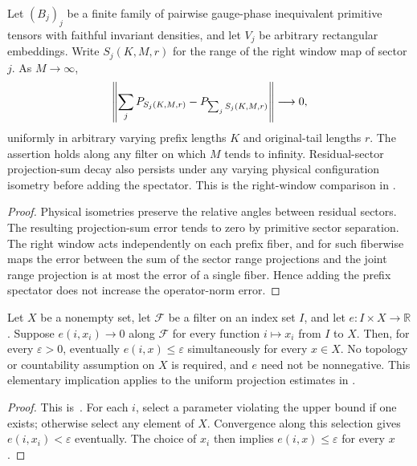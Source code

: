 \begin{lemma}
    \label{thm:residual_window_right_sector_sum}
    \leanok
    Let $(B_j)_j$ be a finite family of pairwise gauge-phase inequivalent
    primitive tensors with faithful invariant densities, and let $V_j$ be
    arbitrary rectangular embeddings. Write $S_j(K,M,r)$ for the range of the
    right window map of sector $j$. As $M\to\infty$,
    \begin{align}
        \left\|\sum_jP_{S_j(K,M,r)}-P_{\sum_jS_j(K,M,r)}\right\|\longrightarrow0,
        \notag
    \end{align}
    uniformly in arbitrary varying prefix lengths $K$ and original-tail
    lengths $r$. The assertion holds along any filter on which $M$ tends to
    infinity. Residual-sector projection-sum decay also persists under any
    varying physical configuration isometry before adding the spectator.
    This is the right-window comparison in
    \cite[Lemma~6.1(i)]{Nachtergaele1996Spectral}.
\end{lemma}
\begin{proof}\leanok
    Physical isometries preserve the relative angles between residual sectors.
    The resulting projection-sum error tends to zero by primitive sector
    separation. The right window acts independently on each prefix fiber,
    and for such fiberwise maps the error between the sum of the sector
    range projections and the joint range projection is at most the error
    of a single fiber. Hence adding the prefix spectator does not increase
    the operator-norm error.
\end{proof}

\begin{lemma}
    \label{thm:uniform_upper_bound_all_selections}
    \leanok
    Let $X$ be a nonempty set, let $\mathcal F$ be a filter on an index set
    $I$, and let $e:I\times X\to\mathbb R$.
    Suppose $e(i,x_i)\to0$ along $\mathcal F$ for every function
    $i\mapsto x_i$ from $I$ to $X$. Then, for every $\varepsilon>0$,
    eventually $e(i,x)\leq\varepsilon$ simultaneously for every $x\in X$.
    No topology or countability assumption on $X$ is required, and $e$
    need not be nonnegative. This elementary implication applies to the
    uniform projection estimates in
    \cite[Lemma~commutation(ii)]{Nachtergaele1996Spectral}.
\end{lemma}
\begin{proof}\leanok
    This is~\cite[``Uniform upper bounds from all
        selections'']{QICLean2026Blueprint}.
    For each $i$, select a parameter violating the upper bound if one exists;
    otherwise select any element of $X$.
    Convergence along this selection gives $e(i,x_i)<\varepsilon$ eventually.
    The choice of $x_i$ then implies $e(i,x)\leq\varepsilon$ for every $x$.
\end{proof}

